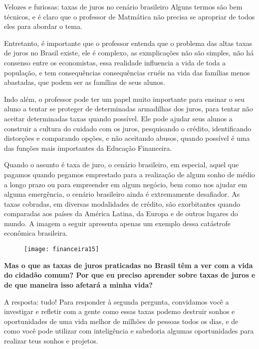 \begin{paginatexto}{Velozes e furiosas: taxas de juros no cenário brasileiro}
Alguns termos são bem técnicos, e é claro que o professor de Matmática não precisa se apropriar de todos eles para abordar o tema.

Entretanto, é importante que o professor entenda que o problema das altas taxas de juros no Brasil existe, ele é complexo, as exmplicações não são simples, não há consenso entre os economistas, essa realidade influencia a vida de toda a população, e tem consequências consequências cruéis na vida das famílias menos abastadas, que podem ser as famílias de seus alunos.

Indo além, o professor pode ter um papel muito importante para ensinar o seu aluno a tentar se proteger de determinadas armadilhas dos juros, para tentar não aceitar determinadas taxas quando possível. Ele pode ajudar seus alunos a construir a cultura do cuidado com os juros, pesquisando o crédito, identificando distorções e comparando opções, e não aceitando abusos, quando possível é uma das funções mais importantes da Educação Financeira.

\end{paginatexto}

\def\currentcolor{session1}



\label{fin-exp-6}

Quando o assunto é taxa de juro, o cenário brasileiro, em  especial, aquel que pagamos quando pegamos emprestado para a realização de algum sonho de médio a longo prazo ou para empreender em algum negócio, bem como nos ajudar em alguma emergência, o cenário brasileiro ainda é extremamente desafiador. As taxas cobradas, em diversas modalidades de crédito, são exorbitantes quando comparadas aos países da América Latina, da Europa e de outros lugares do mundo. A imagem a seguir apresenta apenas um exemplo dessa catástrofe econômica brasileira.

\begin{figure}[H]
\centering

\texttt{[image: financeira15]}
\end{figure}


\textbf{Mas o que as taxas de juros praticadas no Brasil têm a ver com a vida do cidadão comum? Por que eu preciso aprender sobre taxas de juros e de que maneira isso afetará a minha vida?}

A resposta: tudo! Para responder à segunda pergunta, convidamos você a investigar e refletir com a gente como essas taxas podemo destruir sonhos e oportunidades de uma vida melhor de milhões de pessoas todos os dias, e de como você pode utilizar com inteligência e sabedoria algumas oportunidades para realizar teus sonhos e projetos.


